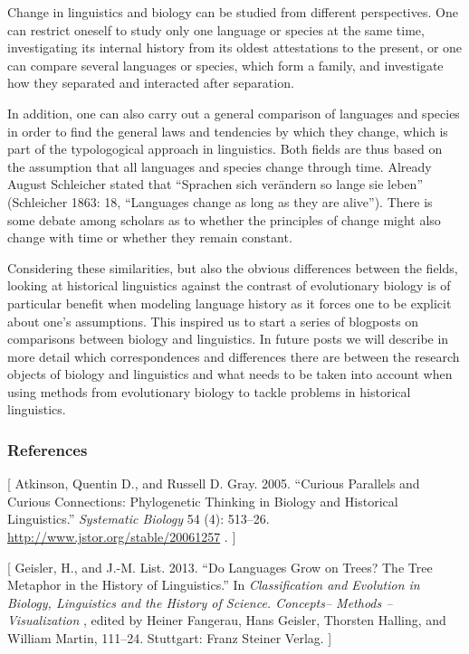 \documentclass[
  a4paper,
  14pt,
  oneside,
  tablecaptionabove
]{scrbook}
\begin{document}
Change in linguistics and biology can be studied from different
perspectives. One can restrict oneself to study only one language or
species at the same time, investigating its internal history from its
oldest attestations to the present, or one can compare several languages
or species, which form a family, and investigate how they separated and
interacted after separation.

In addition, one can also carry out a general comparison of languages
and species in order to find the general laws and tendencies by which
they change, which is part of the typologogical approach in linguistics.
Both fields are thus based on the assumption that all languages and
species change through time. Already August Schleicher stated that
\enquote{Sprachen sich verändern so lange sie leben} (Schleicher 1863:
18, \enquote{Languages change as long as they are alive}). There is some
debate among scholars as to whether the principles of change might also
change with time or whether they remain constant.

Considering these similarities, but also the obvious differences between
the fields, looking at historical linguistics against the contrast of
evolutionary biology is of particular benefit when modeling language
history as it forces one to be explicit about one's assumptions. This
inspired us to start a series of blogposts on comparisons between
biology and linguistics. In future posts we will describe in more detail
which correspondences and differences there are between the research
objects of biology and linguistics and what needs to be taken into
account when using methods from evolutionary biology to tackle problems
in historical linguistics.

\hypertarget{references-3}{%
\subsubsection*{References}\label{references-3}}

{[} Atkinson, Quentin D., and Russell D. Gray. 2005. \enquote{Curious
Parallels and Curious Connections: Phylogenetic Thinking in Biology and
Historical Linguistics.} \emph{Systematic Biology} 54 (4): 513--26.
\url{http://www.jstor.org/stable/20061257} . {]}

{[} Geisler, H., and J.-M. List. 2013. \enquote{Do Languages Grow on
Trees? The Tree Metaphor in the History of Linguistics.} In
\emph{Classification and Evolution in Biology, Linguistics and the
History of Science. Concepts-- Methods -- Visualization} , edited by
Heiner Fangerau, Hans Geisler, Thorsten Halling, and William Martin,
111--24. Stuttgart: Franz Steiner Verlag. {]}
\end{document}
